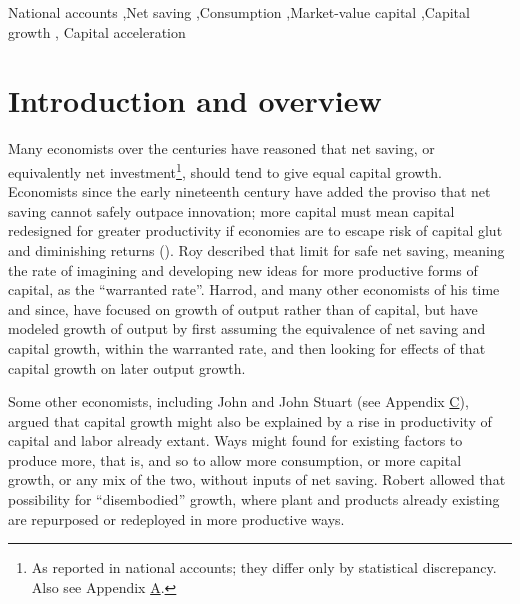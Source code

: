 
\begin{keywords}
National accounts \sep Net
saving \sep Consumption \sep Market-value capital \sep Capital
growth \sep 
Capital acceleration

\end{keywords}

\maketitle

\hypertarget{introduction}{%
\section{Introduction and overview}\label{introduction}}

Many economists over the centuries have reasoned that net saving, or equivalently net investment\footnote{As reported in national accounts; they differ only by statistical discrepancy. Also see Appendix \hyperref[appendix-a]{A}.}, should tend to give equal capital growth. Economists since the early
nineteenth century have added the proviso that net saving cannot
safely outpace innovation; more capital must mean capital redesigned for
greater productivity if economies are to escape risk of capital glut and
diminishing returns
(\citet{westEssayApplicationCapital1815, ricardoEssayProfitsVol1815, malthusEnquiryNatureProgress1815}).
Roy \citet{harrodEssayDynamicTheory1939}
described that limit for safe net saving, meaning the rate of
imagining and developing new ideas for more productive forms of capital,
as the ``warranted rate''. Harrod, and many other economists of his time
and since, have focused on growth of output rather than of capital, but
have modeled growth of output by first assuming the equivalence of net
saving and capital growth, within the warranted rate, and then
looking for effects of that capital growth on later output growth.

Some other economists, including John  \citet{raeNewPrinciplesPolitical1834} and John Stuart 
\citet{millPrinciplesPoliticalEconomy1848} (see Appendix \hyperref[appendix-c]{C}), argued that capital growth might also be explained
by a rise in productivity of capital and labor already extant. Ways
might found for existing factors to produce more, that is, and so to
allow more consumption, or more capital growth, or any mix of the two,
without inputs of net saving. Robert
\citet{solowTECHNICALCHANGEAGGREGATE1957} allowed that possibility for
``disembodied'' growth, where plant and products already existing are
repurposed or redeployed in more productive ways.

